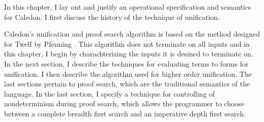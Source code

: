 In this chapter, I lay out and justify an operational specification and semantics 
for Caledon.  I first discuss the history of the technique of unification.

Caledon's unification and proof search algorithm is based on the method designed for Twelf by Pfenning
\citep{pfenning1991logic}.  This algorithm does not terminate on all inputs and in this chapter, 
I begin by charachterizing the inputs it is desined to terminate on.  In the next section, I describe
the techniques for evaluating terms to forms for unification.  I then describe the algorithm
used for higher order unification.  
The last sections pertain to proof search, which are the traditional semantics of the language.
In the last section, I specify a technique for controlling of nondeterminism during proof search, 
which allows the programmer to choose between a complete breadth first search and an imperative depth first search.


